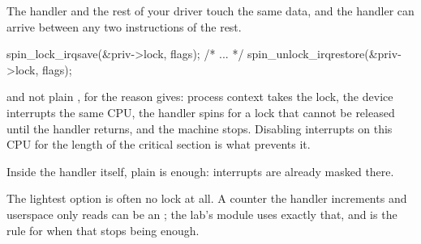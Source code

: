 The handler and the rest of your driver touch the same data, and the handler can arrive between any
two instructions of the rest.

\begin{ccode}
spin_lock_irqsave(&priv->lock, flags);
/* ... */
spin_unlock_irqrestore(&priv->lock, flags);
\end{ccode}

\noindent {} and not plain , for the reason  gives:
process context takes the lock, the device interrupts the same CPU, the handler spins for a lock
that cannot be released until the handler returns, and the machine stops. Disabling interrupts on
this CPU for the length of the critical section is what prevents it.

Inside the handler itself, plain  is enough: interrupts are already masked there.

The lightest option is often no lock at all. A counter the handler increments and userspace only
reads can be an ; the lab's module uses exactly that, and  is the
rule for when that stops being enough.
